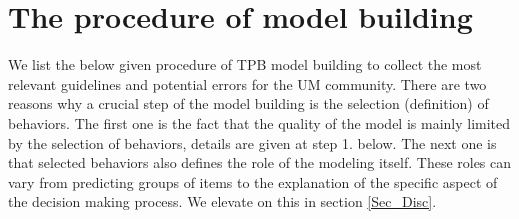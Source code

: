 \documentclass{llncs}
\begin{document}
\section{The procedure of model building}\label{Sec_AzenProc}

We list the below given procedure of TPB model building to collect the most relevant guidelines and potential errors for the UM community. There are two reasons why a crucial step of the model building is the selection (definition) of behaviors. The first one is the fact that the quality of the model is mainly limited by the selection of behaviors, details are given at step 1. below. The next one is that selected behaviors also defines the role of the modeling itself. These roles can vary from predicting groups of items to the explanation of the specific aspect of the decision making process. We elevate on this in section \ref{Sec_Disc}.
\end{document}
